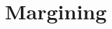 \documentclass[../Thesis_AHoecherl.tex]{subfiles}
\begin{document}
\section{Margining}\label{Margining}
\end{document}
